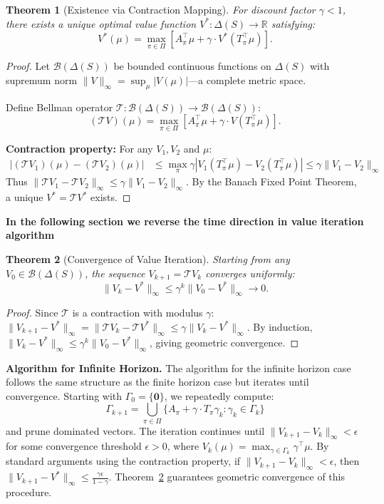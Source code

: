 \documentclass{article}
\newtheorem{theorem}{Theorem}
\begin{document}
\begin{theorem}[Existence via Contraction Mapping]\label{thm:infinite-horizon}
For discount factor $\gamma < 1$, there exists a unique optimal value function $V^*: \Delta(S) \to \mathbb{R}$ satisfying:
\[
V^*(\mu) = \max_{\pi \in \Pi} \left[ A_{\pi}^\top \mu + \gamma \cdot V^*(T_{\pi}^\top \mu) \right].
\]
\end{theorem}

\begin{proof}
Let $\mathcal{B}(\Delta(S))$ be bounded continuous functions on $\Delta(S)$ with supremum norm $\|V\|_\infty = \sup_{\mu} |V(\mu)|$—a complete metric space.

Define Bellman operator $\mathcal{T}: \mathcal{B}(\Delta(S)) \to \mathcal{B}(\Delta(S))$:
\[
(\mathcal{T}V)(\mu) = \max_{\pi \in \Pi} \left[ A_{\pi}^\top \mu + \gamma \cdot V(T_{\pi}^\top \mu) \right].
\]


\textbf{Contraction property:} For any $V_1, V_2$ and $\mu$:
\begin{align*}
|(\mathcal{T}V_1)(\mu) - (\mathcal{T}V_2)(\mu)| &\leq \max_{\pi} \gamma |V_1(T_{\pi}^\top \mu) - V_2(T_{\pi}^\top \mu)| \leq \gamma \|V_1 - V_2\|_\infty
\end{align*}
Thus $\|\mathcal{T}V_1 - \mathcal{T}V_2\|_\infty \leq \gamma \|V_1 - V_2\|_\infty$. By the Banach Fixed Point Theorem, a unique $V^* = \mathcal{T}V^*$ exists.
\end{proof}

\textbf{In the following section we reverse the time direction in value iteration algorithm }

\begin{theorem}[Convergence of Value Iteration]\label{thm:convergence}
Starting from any $V_0 \in \mathcal{B}(\Delta(S))$, the sequence $V_{k+1} = \mathcal{T}V_k$ converges uniformly:
\[
\|V_k - V^*\|_\infty \leq \gamma^k \|V_0 - V^*\|_\infty \to 0.
\]
\end{theorem}

\begin{proof}
Since $\mathcal{T}$ is a contraction with modulus $\gamma$: $\|V_{k+1} - V^*\|_\infty = \|\mathcal{T}V_k - \mathcal{T}V^*\|_\infty \leq \gamma \|V_k - V^*\|_\infty$. By induction, $\|V_k - V^*\|_\infty \leq \gamma^k \|V_0 - V^*\|_\infty$, giving geometric convergence.
\end{proof}

\textbf{Algorithm for Infinite Horizon.} The algorithm for the infinite horizon case follows the same structure as the finite horizon case but iterates until convergence. Starting with $\Gamma_0 = \{\mathbf{0}\}$, we repeatedly compute:
\[
\Gamma_{k+1} = \bigcup_{\pi \in \Pi} \{ A_{\pi} + \gamma \cdot T_{\pi} \gamma_k : \gamma_k \in \Gamma_k \}
\]
and prune dominated vectors. The iteration continues until $\|V_{k+1} - V_k\|_\infty < \epsilon$ for some convergence threshold $\epsilon > 0$, where $V_k(\mu) = \max_{\gamma \in \Gamma_k} \gamma^\top \mu$. By standard arguments using the contraction property, if $\|V_{k+1} - V_k\|_\infty < \epsilon$, then $\|V_{k+1} - V^*\|_\infty \leq \frac{\gamma \epsilon}{1 - \gamma}$. Theorem~\ref{thm:convergence} guarantees geometric convergence of this procedure.
\end{document}
